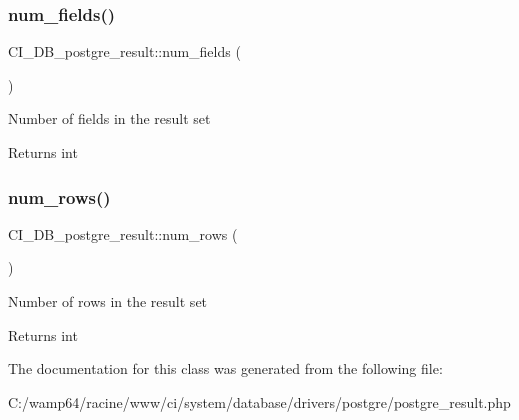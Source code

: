 \subsubsection{\texorpdfstring{num\+\_\+fields()}{num\_fields()}}
{\footnotesize\ttfamily C\+I\+\_\+\+D\+B\+\_\+postgre\+\_\+result\+::num\+\_\+fields (\begin{DoxyParamCaption}{ }\end{DoxyParamCaption})}

Number of fields in the result set

\begin{DoxyReturn}{Returns}
int 
\end{DoxyReturn}
\mbox{\label{class_c_i___d_b__postgre__result_ae11f2d750aa473b91963159d9dcf5ae3}} 
\subsubsection{\texorpdfstring{num\+\_\+rows()}{num\_rows()}}
{\footnotesize\ttfamily C\+I\+\_\+\+D\+B\+\_\+postgre\+\_\+result\+::num\+\_\+rows (\begin{DoxyParamCaption}{ }\end{DoxyParamCaption})}

Number of rows in the result set

\begin{DoxyReturn}{Returns}
int 
\end{DoxyReturn}


The documentation for this class was generated from the following file\+:\begin{DoxyCompactItemize}
\item 
C\+:/wamp64/racine/www/ci/system/database/drivers/postgre/postgre\+\_\+result.\+php\end{DoxyCompactItemize}
